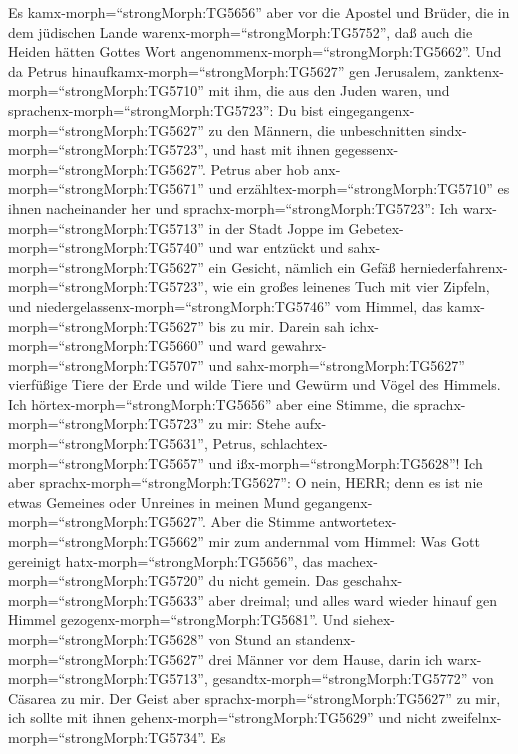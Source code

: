  Es kamx-morph=``strongMorph:TG5656'' aber vor die Apostel
und Brüder, die in dem jüdischen Lande
warenx-morph=``strongMorph:TG5752'', daß auch die Heiden hätten Gottes
Wort angenommenx-morph=``strongMorph:TG5662''.  Und da
Petrus hinaufkamx-morph=``strongMorph:TG5627'' gen Jerusalem,
zanktenx-morph=``strongMorph:TG5710'' mit ihm, die aus den Juden waren,
 und sprachenx-morph=``strongMorph:TG5723'': Du bist
eingegangenx-morph=``strongMorph:TG5627'' zu den Männern, die
unbeschnitten sindx-morph=``strongMorph:TG5723'', und hast mit ihnen
gegessenx-morph=``strongMorph:TG5627''.  Petrus aber hob
anx-morph=``strongMorph:TG5671'' und
erzähltex-morph=``strongMorph:TG5710'' es ihnen nacheinander her und
sprachx-morph=``strongMorph:TG5723'':  Ich
warx-morph=``strongMorph:TG5713'' in der Stadt Joppe im
Gebetex-morph=``strongMorph:TG5740'' und war entzückt und
sahx-morph=``strongMorph:TG5627'' ein Gesicht, nämlich ein Gefäß
herniederfahrenx-morph=``strongMorph:TG5723'', wie ein großes leinenes
Tuch mit vier Zipfeln, und niedergelassenx-morph=``strongMorph:TG5746''
vom Himmel, das kamx-morph=``strongMorph:TG5627'' bis zu mir.
 Darein sah ichx-morph=``strongMorph:TG5660'' und ward
gewahrx-morph=``strongMorph:TG5707'' und
sahx-morph=``strongMorph:TG5627'' vierfüßige Tiere der Erde und wilde
Tiere und Gewürm und Vögel des Himmels.  Ich
hörtex-morph=``strongMorph:TG5656'' aber eine Stimme, die
sprachx-morph=``strongMorph:TG5723'' zu mir: Stehe
aufx-morph=``strongMorph:TG5631'', Petrus,
schlachtex-morph=``strongMorph:TG5657'' und
ißx-morph=``strongMorph:TG5628''!  Ich aber
sprachx-morph=``strongMorph:TG5627'': O nein, HERR; denn es ist nie
etwas Gemeines oder Unreines in meinen Mund
gegangenx-morph=``strongMorph:TG5627''.  Aber die Stimme
antwortetex-morph=``strongMorph:TG5662'' mir zum andernmal vom Himmel:
Was Gott gereinigt hatx-morph=``strongMorph:TG5656'', das
machex-morph=``strongMorph:TG5720'' du nicht gemein.  Das
geschahx-morph=``strongMorph:TG5633'' aber dreimal; und alles ward
wieder hinauf gen Himmel gezogenx-morph=``strongMorph:TG5681''.
 Und siehex-morph=``strongMorph:TG5628'' von Stund an
standenx-morph=``strongMorph:TG5627'' drei Männer vor dem Hause, darin
ich warx-morph=``strongMorph:TG5713'',
gesandtx-morph=``strongMorph:TG5772'' von Cäsarea zu mir. 
Der Geist aber sprachx-morph=``strongMorph:TG5627'' zu mir, ich sollte
mit ihnen gehenx-morph=``strongMorph:TG5629'' und nicht
zweifelnx-morph=``strongMorph:TG5734''. Es
